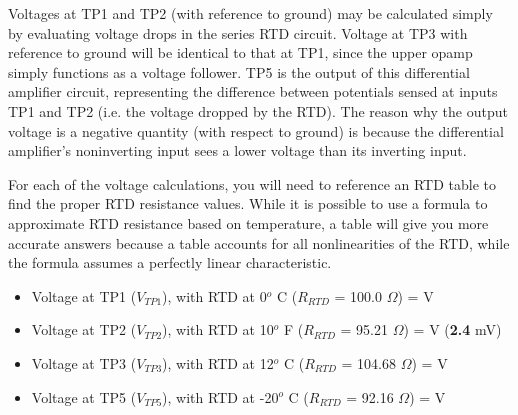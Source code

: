 Voltages at TP1 and TP2 (with reference to ground) may be calculated simply by evaluating voltage drops in the series RTD circuit.  Voltage at TP3 with reference to ground will be identical to that at TP1, since the upper opamp simply functions as a voltage follower.  TP5 is the output of this differential amplifier circuit, representing the difference between potentials sensed at inputs TP1 and TP2 (i.e. the voltage dropped by the RTD).  The reason why the output voltage is a negative quantity (with respect to ground) is because the differential amplifier's noninverting input sees a lower voltage than its inverting input.

\vskip 10pt

For each of the voltage calculations, you will need to reference an RTD table to find the proper RTD resistance values.  While it is possible to use a formula to approximate RTD resistance based on temperature, a table will give you more accurate answers because a table accounts for all nonlinearities of the RTD, while the formula assumes a perfectly linear characteristic.

\vskip 10pt

\begin{itemize}
\item{} Voltage at TP1 ($V_{TP1}$), with RTD at 0$^{o}$ C ($R_{RTD}$ = 100.0 $\Omega$) =  V
\vskip 5pt
\item{} Voltage at TP2 ($V_{TP2}$), with RTD at 10$^{o}$ F ($R_{RTD}$ = 95.21 $\Omega$) =  V ({\bf 2.4} mV)
\vskip 5pt
\item{} Voltage at TP3 ($V_{TP3}$), with RTD at 12$^{o}$ C ($R_{RTD}$ = 104.68 $\Omega$) =  V
\vskip 5pt
\item{} Voltage at TP5 ($V_{TP5}$), with RTD at -20$^{o}$ C ($R_{RTD}$ = 92.16 $\Omega$) =  V
\end{itemize}











